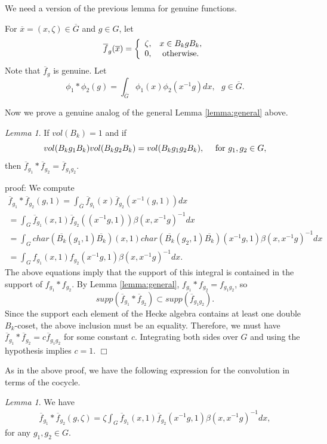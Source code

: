 \documentclass[12pt,letterpaper]{amsart}
\theoremstyle{definition}
\theoremstyle{remark}
\newtheorem{lemma}[theorem]{Lemma}
\begin{document}
We need a version of the previous lemma for genuine 
functions. 

For $\overline{x}=(x,\zeta)\in\overline{G}$
and $g\in G$, let
\[
\overline{f}_{g}(\overline{x})
=
\left\{
\begin{array}{cc}
\zeta,& x\in B_kgB_k,\\
0,& {\rm otherwise}.
\end{array}
\right.
\]
Note that $\overline{f}_g$ is genuine. Let
\[
\phi_1*\phi_2(g)=
\int_{\overline{G}}\phi_1(x)\phi_2(x^{-1}g) dx,
\ \ \ g\in \overline{G}.
\]

Now we prove a genuine 
analog of the general Lemma \ref{lemma:general} above.

\begin{lemma} 
If $vol(B_k)=1$ and if 
\[
vol(B_kg_1B_k)
vol(B_kg_2B_k)
=vol(B_kg_1g_2B_k),\ \ \ \ {\rm for}\ g_1,g_2\in G,
\]
then $\overline{f}_{g_1}*\overline{f}_{g_2}=
\overline{f}_{g_1g_2}$.
\label{lemma:genuine}
\end{lemma}

proof: We compute
\[
\begin{array}{c}
\overline{f}_{g_1}*\overline{f}_{g_2}(g,1)=
\int_{\overline{G}}
\overline{f}_{g_1}(x)\overline{f}_{g_2}(x^{-1}(g,1))dx\\
=\int_{G}\overline{f}_{g_1}(x,1)\overline{f}_{g_2}((x^{-1}g,1))
\beta(x,x^{-1}g)^{-1}dx\\
=\int_{G}
char(\overline{B_k}(g_1,1)\overline{B_k})(x,1)
char(\overline{B_k}(g_2,1)\overline{B_k})(x^{-1}g,1)
\beta(x,x^{-1}g)^{-1}dx\\
=\int_{G}f_{g_1}(x,1)f_{g_2}(x^{-1}g,1)
\beta(x,x^{-1}g)^{-1}dx.
\end{array}
\]
The above equations imply that
the support of this integral is contained in the support
of $f_{g_1}*f_{g_2}$. By Lemma \ref{lemma:general},
$f_{g_1}*f_{g_2}=f_{g_1g_2}$, so 
\[
supp(\overline{f}_{g_1}*\overline{f}_{g_2})
\subset supp(\overline{f}_{g_1g_2}).
\]
Since the support each element of the Hecke algebra 
contains at least one double $B_k$-coset, the above
inclusion must be an equality. Therefore, we must have
$\overline{f}_{g_1}*\overline{f}_{g_2}=c\overline{f}_{g_1g_2}$
for some constant $c$. Integrating both sides over 
$G$ and using the hypothesis implies $c=1$.   $\Box$

As in the above proof, we have the following expression
for the convolution in terms of the cocycle.

\begin{lemma}
\label{lemma:convolve}
We have
\[
\begin{array}{c}
\overline{f}_{g_1}*\overline{f}_{g_2}(g,\zeta)
=\zeta\int_{G}\overline{f}_{g_1}(x,1)\overline{f}_{g_2}(x^{-1}g,1)
\beta(x,x^{-1}g)^{-1}dx,
\end{array}
\]
for any $g_1,g_2\in G$.
\end{lemma}
\end{document}
